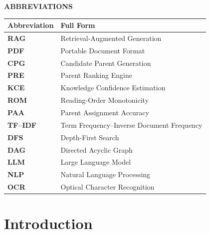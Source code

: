 \documentclass[12pt,a4paper,twoside,openright]{report}
\makeatletter
\def\cleardoublepage{\clearpage\if@twoside
  \ifodd\c@page\else
    \hbox{}\thispagestyle{empty}\newpage
    \if@twocolumn\hbox{}\newpage\fi
  \fi\fi}
\makeatother
\begin{document}
\tableofcontents\cleardoublepage

{}
\listoffigures\cleardoublepage

{}
\listoftables\cleardoublepage

{}
\begin{center}{\Large\bfseries ABBREVIATIONS}\end{center}
\vspace{6mm}
\noindent
\begin{tabularx}{\textwidth}{@{} >{\bfseries}p{3.0cm} X @{}}
\toprule
\textbf{Abbreviation} & \textbf{Full Form} \\ \midrule
RAG   & Retrieval-Augmented Generation \\
PDF   & Portable Document Format \\
CPG   & Candidate Parent Generation \\
PRE   & Parent Ranking Engine \\
KCE   & Knowledge Confidence Estimation \\
ROM   & Reading-Order Monotonicity \\
PAA   & Parent Assignment Accuracy \\
TF--IDF & Term Frequency--Inverse Document Frequency \\
DFS   & Depth-First Search \\
DAG   & Directed Acyclic Graph \\
LLM   & Large Language Model \\
NLP   & Natural Language Processing \\
OCR   & Optical Character Recognition \\ \bottomrule
\end{tabularx}
\cleardoublepage

\cleardoublepage
{}\setcounter{page}{1}
\chapter{Introduction}
\end{document}
